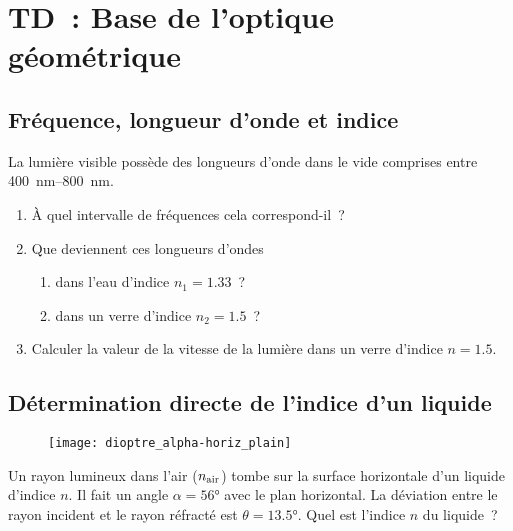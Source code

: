 \documentclass[a4paper, 12pt, final, garamond]{book}
\begin{document}
\setcounter{chapter}{1}

\chapter{TD~: Base de l'optique g\'eom\'etrique}

\section{Fréquence, longueur d'onde et indice}
La lumière visible possède des longueurs d'onde dans le vide comprises entre
\SIrange{400}{800}{nm}.
\begin{enumerate}
    \item À quel intervalle de fréquences cela correspond-il~?
    \item Que deviennent ces longueurs d'ondes
        \begin{enumerate}
            \item dans l'eau d'indice $n_1 = \num{1.33}$~?
            \item dans un verre d'indice $n_2 = \num{1.5}$~?
        \end{enumerate}
    \item Calculer la valeur de la vitesse de la lumière dans un verre d'indice
        $n = \num{1.5}$.
\end{enumerate}

\section{Détermination directe de l'indice d'un liquide}
\begin{wrapfigure}[4]{R}{.3\linewidth}
    \vspace*{-1.5cm}
    \centering
    \texttt{[image: dioptre\_alpha-horiz\_plain]}
    \label{fig:alpha_horiz}
\end{wrapfigure}
\vspace{1cm}
Un rayon lumineux dans l'air ($n_{\rm air}$) tombe sur la surface horizontale
d'un liquide d'indice $n$. Il fait un angle $\alpha = \ang{56;;}$ avec le plan
horizontal. La déviation entre le rayon incident et le rayon réfracté est
$\theta = \ang{13.5;;}$. Quel est l'indice $n$ du liquide~?
\vspace{1cm}
\end{document}

